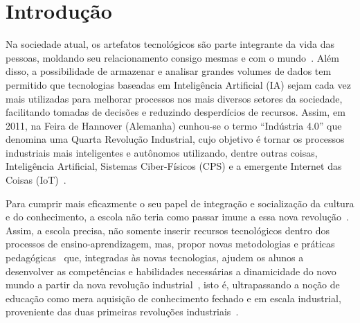 \chapter{Introdução} \label{Chap:intro}

Na sociedade atual, os artefatos tecnológicos são parte integrante da vida das pessoas, moldando seu relacionamento consigo mesmas e com o mundo~\citep{Leitao:2014}. Além disso, a possibilidade de armazenar e analisar grandes volumes de dados tem permitido que tecnologias baseadas em Inteligência Artificial (IA) sejam cada vez mais utilizadas para melhorar processos nos mais diversos setores da sociedade, facilitando tomadas de decisões e reduzindo desperdícios de recursos. Assim, em 2011, na Feira de Hannover (Alemanha) cunhou-se o termo ``Indústria 4.0'' que denomina uma Quarta Revolução Industrial, cujo objetivo é tornar os processos industriais mais inteligentes e autônomos utilizando, dentre outras coisas, Inteligência Artificial, Sistemas Ciber-Físicos (CPS) e a emergente Internet das Coisas (IoT)~\citep{MCDIC:2014, Almeida:2018}.


Para cumprir mais eficazmente o seu papel de integração e socialização da cultura e do conhecimento, a escola não teria como passar imune a essa nova revolução~\citep{Nogueira:2013, Levy:2010}. Assim, a escola precisa, não somente inserir recursos tecnológicos dentro dos processos de ensino-aprendizagem, mas, propor novas metodologias e práticas pedagógicas~\citep{Sousa:2011} que, integradas às novas tecnologias, ajudem os alunos a desenvolver as competências e habilidades necessárias a dinamicidade do novo mundo a partir da nova revolução industrial~\citep{Fuhr:2018}, isto é, ultrapassando a noção de educação como mera aquisição de conhecimento fechado e em escala industrial, proveniente das duas primeiras revoluções industriais~\citep{Intelitek:2018}.


